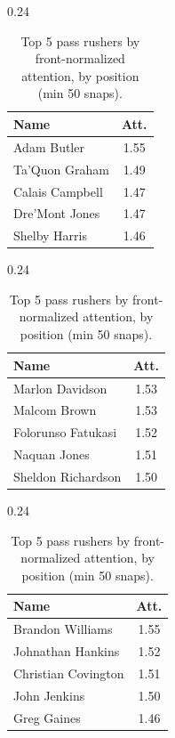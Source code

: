 \begin{table}[h!]
\centering
\begin{subtable}{0.24\textwidth}
\centering
\scriptsize
\begin{tabular}{lc}
\toprule
Name & Att. \\
\midrule
Adam Butler & 1.55 \\
Ta'Quon Graham & 1.49 \\
Calais Campbell & 1.47 \\
Dre'Mont Jones & 1.47 \\
Shelby Harris & 1.46 \\
\bottomrule
\end{tabular}
\caption{Edge}
\end{subtable}
\hfill
\begin{subtable}{0.24\textwidth}
\centering
\scriptsize
\begin{tabular}{lc}
\toprule
Name & Att. \\
\midrule
Marlon Davidson & 1.53 \\
Malcom Brown & 1.53 \\
Folorunso Fatukasi & 1.52 \\
Naquan Jones & 1.51 \\
Sheldon Richardson & 1.50 \\
\bottomrule
\end{tabular}
\caption{DT}
\end{subtable}
\hfill
\begin{subtable}{0.24\textwidth}
\centering
\scriptsize
\begin{tabular}{lc}
\toprule
Name & Att. \\
\midrule
Brandon Williams & 1.55 \\
Johnathan Hankins & 1.52 \\
Christian Covington & 1.51 \\
John Jenkins & 1.50 \\
Greg Gaines & 1.46 \\
\bottomrule
\end{tabular}
\caption{NT}
\end{subtable}
\caption{Top 5 pass rushers by front-normalized attention, by position (min 50 snaps).}
\label{tab:att_top_norm}
\end{table}
